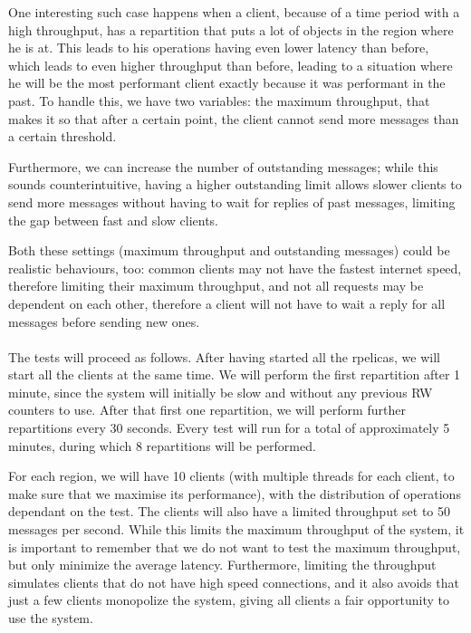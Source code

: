 One interesting such case happens when a client, because of a time period with a high throughput, has a repartition that puts a lot of objects in the region where he is at. This leads to his operations having even lower latency than before, which leads to even higher throughput than before, leading to a situation where he will be the most performant client exactly because it was performant in the past. To handle this, we have two variables: the maximum throughput, that makes it so that after a certain point, the client cannot send more messages than a certain threshold.

Furthermore, we can increase the number of outstanding messages; while this sounds counterintuitive, having a higher outstanding limit allows slower clients to send more messages without having to wait for replies of past messages, limiting the gap between fast and slow clients.

Both these settings (maximum throughput and outstanding messages) could be realistic behaviours, too: common clients may not have the fastest internet speed, therefore limiting their maximum throughput, and not all requests may be dependent on each other, therefore a client will not have to wait a reply for all messages before sending new ones.
\\\\
The tests will proceed as follows. After having started all the rpelicas, we will start all the clients at the same time. We will perform the first repartition after 1 minute, since the system will initially be slow and without any previous RW counters to use. After that first one repartition, we will perform further repartitions every 30 seconds. Every test will run for a total of approximately 5 minutes, during which 8 repartitions will be performed.

For each region, we will have 10 clients (with multiple threads for each client, to make sure that we maximise its performance), with the distribution of operations dependant on the test. The clients will also have a limited throughput set to 50 messages per second. While this limits the maximum throughput of the system, it is important to remember that we do not want to test the maximum throughput, but only minimize the average latency. Furthermore, limiting the throughput simulates clients that do not have high speed connections, and it also avoids that just a few clients monopolize the system, giving all clients a fair opportunity to use the system.

